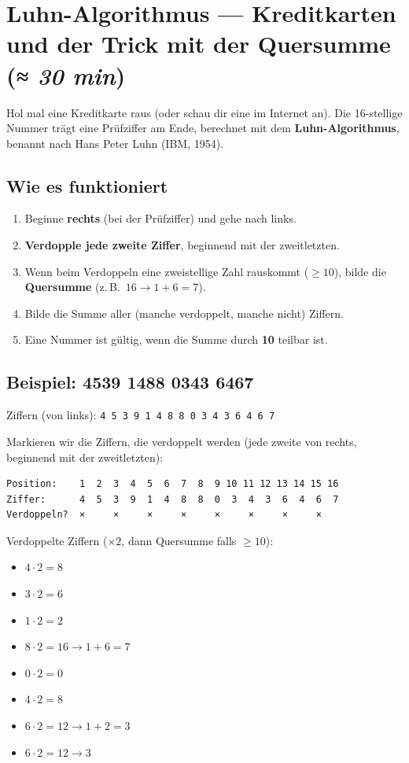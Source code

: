 \section{Luhn-Algorithmus — Kreditkarten und der Trick mit der Quersumme \normalfont(\textit{≈ 30 min})}

Hol mal eine Kreditkarte raus (oder schau dir eine im Internet an).
Die 16-stellige Nummer trägt eine Prüfziffer am Ende, berechnet mit
dem \textbf{Luhn-Algorithmus}, benannt nach Hans Peter Luhn (IBM,
1954).

\subsection*{Wie es funktioniert}

\begin{enumerate}
\item Beginne \textbf{rechts} (bei der Prüfziffer) und gehe nach links.
\item \textbf{Verdopple jede zweite Ziffer}, beginnend mit der
  zweitletzten.
\item Wenn beim Verdoppeln eine zweistellige Zahl rauskommt
  ($\ge 10$), bilde die \textbf{Quersumme} (z.\,B.\
  $16 \to 1 + 6 = 7$).
\item Bilde die Summe aller (manche verdoppelt, manche nicht) Ziffern.
\item Eine Nummer ist gültig, wenn die Summe durch \textbf{10} teilbar
  ist.
\end{enumerate}

\subsection*{Beispiel: 4539 1488 0343 6467}

Ziffern (von links): \texttt{4 5 3 9 1 4 8 8 0 3 4 3 6 4 6 7}

Markieren wir die Ziffern, die verdoppelt werden (jede zweite von
rechts, beginnend mit der zweitletzten):

\begin{verbatim}
Position:    1  2  3  4  5  6  7  8  9 10 11 12 13 14 15 16
Ziffer:      4  5  3  9  1  4  8  8  0  3  4  3  6  4  6  7
Verdoppeln?  ×     ×     ×     ×     ×     ×     ×     ×
\end{verbatim}

Verdoppelte Ziffern ($\times 2$, dann Quersumme falls $\ge 10$):
\begin{itemize}
\item $4 \cdot 2 = 8$
\item $3 \cdot 2 = 6$
\item $1 \cdot 2 = 2$
\item $8 \cdot 2 = 16 \to 1 + 6 = 7$
\item $0 \cdot 2 = 0$
\item $4 \cdot 2 = 8$
\item $6 \cdot 2 = 12 \to 1 + 2 = 3$
\item $6 \cdot 2 = 12 \to 3$
\end{itemize}

